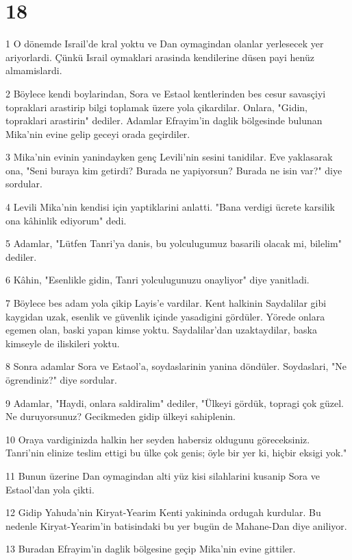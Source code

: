 \chapter{18}

\par 1 O dönemde Israil'de kral yoktu ve Dan oymagindan olanlar yerlesecek yer ariyorlardi. Çünkü Israil oymaklari arasinda kendilerine düsen payi henüz almamislardi.
\par 2 Böylece kendi boylarindan, Sora ve Estaol kentlerinden bes cesur savasçiyi topraklari arastirip bilgi toplamak üzere yola çikardilar. Onlara, "Gidin, topraklari arastirin" dediler. Adamlar Efrayim'in daglik bölgesinde bulunan Mika'nin evine gelip geceyi orada geçirdiler.
\par 3 Mika'nin evinin yanindayken genç Levili'nin sesini tanidilar. Eve yaklasarak ona, "Seni buraya kim getirdi? Burada ne yapiyorsun? Burada ne isin var?" diye sordular.
\par 4 Levili Mika'nin kendisi için yaptiklarini anlatti. "Bana verdigi ücrete karsilik ona kâhinlik ediyorum" dedi.
\par 5 Adamlar, "Lütfen Tanri'ya danis, bu yolculugumuz basarili olacak mi, bilelim" dediler.
\par 6 Kâhin, "Esenlikle gidin, Tanri yolculugunuzu onayliyor" diye yanitladi.
\par 7 Böylece bes adam yola çikip Layis'e vardilar. Kent halkinin Saydalilar gibi kaygidan uzak, esenlik ve güvenlik içinde yasadigini gördüler. Yörede onlara egemen olan, baski yapan kimse yoktu. Saydalilar'dan uzaktaydilar, baska kimseyle de iliskileri yoktu.
\par 8 Sonra adamlar Sora ve Estaol'a, soydaslarinin yanina döndüler. Soydaslari, "Ne ögrendiniz?" diye sordular.
\par 9 Adamlar, "Haydi, onlara saldiralim" dediler, "Ülkeyi gördük, topragi çok güzel. Ne duruyorsunuz? Gecikmeden gidip ülkeyi sahiplenin.
\par 10 Oraya vardiginizda halkin her seyden habersiz oldugunu göreceksiniz. Tanri'nin elinize teslim ettigi bu ülke çok genis; öyle bir yer ki, hiçbir eksigi yok."
\par 11 Bunun üzerine Dan oymagindan alti yüz kisi silahlarini kusanip Sora ve Estaol'dan yola çikti.
\par 12 Gidip Yahuda'nin Kiryat-Yearim Kenti yakininda ordugah kurdular. Bu nedenle Kiryat-Yearim'in batisindaki bu yer bugün de Mahane-Dan diye aniliyor.
\par 13 Buradan Efrayim'in daglik bölgesine geçip Mika'nin evine gittiler.
